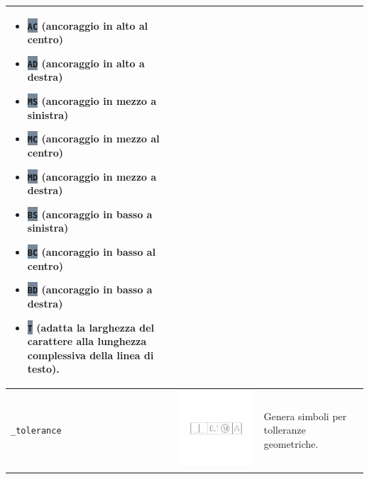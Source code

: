 \documentclass[..]{../IEEEphot}
\newcommand{\param}[1]{\colorbox{LightSlateGray}{\color{Navy}\texttt{\textbf{#1}}}}
\begin{document}
\begin{center}
\begin{longtable}{m{.2\linewidth}m{.2\linewidth}m{.25\linewidth}m{.25\linewidth}}
\begin{itemize}
\item \param{AC} (ancoraggio in alto al centro)
\item \param{AD} (ancoraggio in alto a destra)
\item \param{MS} (ancoraggio in mezzo a sinistra)
\item \param{MC} (ancoraggio in mezzo al centro)
\item \param{MD} (ancoraggio in mezzo a destra)
\item \param{BS} (ancoraggio in basso a sinistra)
\item \param{BC} (ancoraggio in basso al centro)
\item \param{BD} (ancoraggio in basso a destra)
\item \param{T} (adatta la larghezza del carattere alla lunghezza complessiva della linea di testo).
\end{itemize}
\\
\midrule
\texttt{\_tolerance} & \includegraphics[width = 0.8\linewidth, keepaspectratio]{../images/jpg/_tolerance.jpg} & Genera simboli per tolleranze geometriche. \\
\midrule

\end{longtable}
\end{center}
\end{document}
